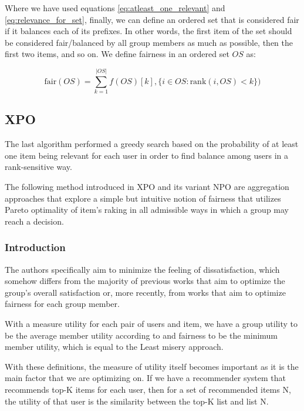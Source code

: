 Where we have used equations \ref{eq:atleast_one_relevant} and \ref{eq:relevance_for_set}, finally, we can define an ordered set that is considered fair if it balances each of its prefixes. In other words, the first item of the set should be considered fair/balanced by all group members as much as possible, then the first two items, and so on. We define fairness in an ordered set $OS$ as:

\begin{equation}
    \textrm{fair}(OS) = \sum_{k=1}^{|OS|}{f(OS)[k], \{i \in OS : \textrm{rank}(i, OS) < k\})}
\end{equation}




\subsection{XPO} \label{subsec:03_advanced_methods.xpo}
The last algorithm performed a greedy search based on the probability of at least one item being relevant for each user in order to find balance among users in a rank-sensitive way.

The following method introduced in \cite{sacharidis_2019_top_n_with_fairness} XPO and its variant NPO are aggregation approaches that explore a simple but intuitive notion of fairness that utilizes Pareto optimality of item's raking in all admissible ways in which a group may reach a decision.

\subsubsection{Introduction}
The authors specifically aim to minimize the feeling of dissatisfaction, which somehow differs from the majority of previous works that aim to optimize the group's overall satisfaction or, more recently, from works that aim to optimize fairness for each group member.

With a measure utility for each pair of users and item, we have a group utility to be the average member utility according to \cite{social_welfare} and fairness to be the minimum member utility, which is equal to the Least misery approach.

With these definitions, the measure of utility itself becomes important as it is the main factor that we are optimizing on. If we have a recommender system that recommends top-K items for each user, then for a set of recommended items N, the utility of that user is the similarity between the top-K list and list N.

